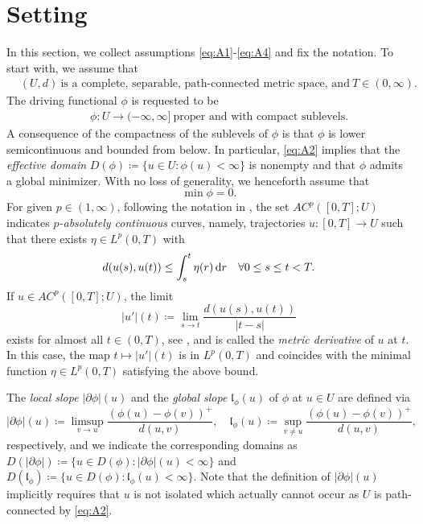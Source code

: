 \documentclass[reqno]{amsart}
\newcommand{\dr}{{\rm d} r}
\renewcommand{\sl}{|\partial \phi|}
\newcommand{\gl}{\mathfrak{l}_\phi}
\begin{document}
 

 \section{Setting}\label{sec:setting}
In this section, we collect assumptions \eqref{eq:A1}-\eqref{eq:A4} and fix  the  notation.  To
start with, we assume that 
 \begin{align}
   &(U,d) \ \text{is a complete, separable, path-connected metric
     space, and} \  T \in (0,\infty). \label{eq:A1}
 \end{align}
 The driving functional  $\phi$  is  requested  to be 
  \begin{align}
   &\quad\phi: U \to (-\infty,\infty] \  \text{proper and with compact
     sublevels.}\label{eq:A2}
  \end{align}
A consequence of the compactness of the sublevels of $\phi$ is
 that $\phi$ is lower semicontinuous and bounded from below.
In particular, \eqref{eq:A2} implies that the  {\it effective domain} $D(\phi)\coloneqq\{u \in U :\phi(u)
<\infty \}$ is nonempty and that $\phi$ admits a global minimizer. With
                                no loss of generality, we henceforth 
                                assume that
\begin{equation}\label{eq:A_min0}
    \min \phi=0.
\end{equation}
For given $p \in (1,\infty)$,   following  the notation in \cite{Ambrosio08}, the set $AC^p([0,T];U)$
indicates {\it $p$-absolutely continuous} curves, namely, trajectories 
$u: [0,T]\to U$ such that there exists $\eta\in
L^p(0,T)$ with 
\begin{equation*}
d(u(s),u(t))\leq \int_s^t \eta(r)\,\dr \quad\forall 0 \leq
s\leq t < T.
\end{equation*}
If $u
\in AC^p([0,T];U) $, the limit
$$|u'|(t) \coloneqq \lim_{s\to t}\frac{d(u(s),u(t))}{|t-s|}$$
exists for almost  all  $t\in (0,T)$, see
\cite[Thm. 1.1.2, p.~24]{Ambrosio08}, and is called  the  {\it metric
derivative} of $u$ at $t$. In this case, the map
 $t \mapsto|u'|(t)$  is in $ L^p(0,T) $
and coincides with the minimal function $\eta\in L^p(0,T)$ satisfying the above bound.

 

The {\it local slope} $\sl(u)$ and the {\it global slope} $\gl(u)$ \cite{Ambrosio08,Cheeger99,DeGiorgi80} of $ \phi
$ at $ u \in U$ are defined via
$$
\sl(u) \coloneqq \limsup_{v \to u} \frac{(\phi(u) -
  \phi(v))^+}{d(u,v)}, \quad \gl(u) \coloneqq \sup_{v \not =u}\frac{(\phi(u) -
  \phi(v))^+}{d(u,v)},
$$
respectively, and we indicate the corresponding domains as  
$D(\sl) \coloneqq \{u \in D(\phi): \sl(u)<\infty\}$ and $D(\gl)  \coloneqq \{u \in D(\phi): \gl(u)<\infty\}$. Note that the definition
of $\sl(u)$ implicitly requires that $u$ is not isolated   which actually cannot occur as $U$ is  
path-connected by \eqref{eq:A2}.
\end{document}

